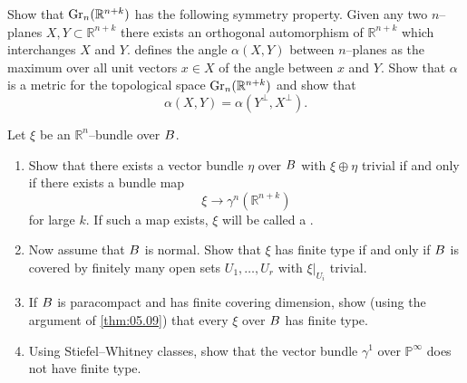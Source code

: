 \documentclass[../main]{subfiles}
\begin{document}
\begin{problem}\label{prob-5-D}
Show that $\operatorname{Gr}_n({\mathbb R}^{n + k})$ has the following symmetry property. Given any two $n$--planes $X, Y \subset {\mathbb R}^{n + k}$ there exists an orthogonal automorphism of ${\mathbb R}^{n + k}$ which interchanges $X$ and $Y$. \cite{whitehead1961} defines the angle $\alpha(X, Y)$ between $n$--planes as the maximum over all unit vectors $x \in X$ of the angle between $x$ and $Y$. Show that $\alpha$ is a metric for the topological space $\operatorname{Gr}_n({\mathbb R}^{n + k})$ and show that \[\alpha(X, Y) = \alpha(Y^\bot, X^\bot).\]
\end{problem}

\begin{problem}\label{prob-5-E}
Let $\xi$ be an ${\mathbb R}^n$--bundle over $B$. 

\begin{enumerate}[label=\arabic*)]
    \item Show that there exists a vector bundle $\eta$ over $B$ with $\xi \oplus \eta$ trivial if and only if there exists a bundle map \[\xi \longrightarrow \gamma^n({\mathbb R}^{n + k})\] for large $k$. If such a map exists, $\xi$ will be called a .
    \item Now assume that $B$ is normal. Show that $\xi$ has finite type if and only if $B$ is covered by finitely many open sets $U_1, \ldots, U_r$ with $\xi |_{U_i}$ trivial.
    \item If $B$ is paracompact and has finite covering dimension, show (using the argument of \ref{thm:05.09}) that every $\xi$ over $B$ has finite type.
    \item Using Stiefel--Whitney classes, show that the vector bundle $\gamma^1$ over ${\mathbb P}^\infty$ does not have finite type. 
\end{enumerate} 
\end{problem}
\end{document}
